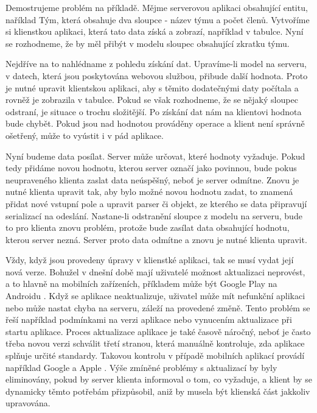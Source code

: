 Demostrujeme problém na příkladě. Mějme serverovou aplikaci obsahující entitu, naříklad Tým, která obsahuje dva sloupce - název týmu a počet členů. Vytvoříme si klienstkou aplikaci, která tato data získá a zobrazí, například v tabulce. Nyní se rozhodneme, že by měl přibýt v modelu sloupec obsahující zkratku týmu. 

Nejdříve na to nahlédname z pohledu získání dat. Upravíme-li model na serveru, v datech, která jsou poskytována webovou službou, přibude další hodnota. Proto je nutné upravit klientskou aplikaci, aby s těmito dodatečnými daty počítala a rovněž je zobrazila v tabulce. Pokud se však rozhodneme, že se nějaký sloupec odstraní, je situace o trochu složitější. Po získání dat nám na klientovi hodnota bude chybět. Pokud jsou nad hodnotou prováděny operace a klient není správně ošetřený, může to vyústit i v pád aplikace.

Nyní budeme data posílat. Server může určovat, které hodnoty vyžaduje. Pokud tedy přidáme novou hodnotu, kterou server označí jako povinnou, bude pokus neupraveného klienta zaslat data neúspěšný, neboť je server odmítne. Znovu je nutné klienta upravit tak, aby bylo možné novou hodnotu zadat, to znamená přidat nové vstupní pole a upravit parser či objekt, ze kterého se data připravují serializací na odeslání. Nastane-li odstranění sloupce z modelu na serveru, bude to pro klienta znovu problém, protože bude zasílat data obsahující hodnotu, kterou server nezná. Server proto data odmítne a znovu je nutné klienta upravit. 

Vždy, když jsou provedeny úpravy v klienstké aplikaci, tak se musí vydat její nová verze. Bohužel v dnešní době mají uživatelé možnost aktualizaci neprovést, a to hlavně na mobilních zařízeních, příkladem může být Google Play na Androidu \cite{android-auto-update}. Když se aplikace neaktualizuje, uživatel může mít nefunkční aplikaci nebo může nastat chyba na serveru, záleží na provedené změně. Tento problém se řeší například podmínkami na verzi aplikace nebo vynucením aktualizace při startu aplikace. Proces aktualizace aplikace je také časově náročný, neboť je často třeba novou verzi schválit třetí stranou, která manuálně kontroluje, zda aplikace splňuje určité standardy. Takovou kontrolu v případě mobilních aplikací provádí například Google a Apple \cite{app-approval}. Výše zmíněné problémy s aktualizací by byly eliminovány, pokud by server klienta informoval o tom, co vyžaduje, a klient by se dynamicky těmto potřebám přizpůsobil, aniž by musela být klienská část jakkoliv upravována.

